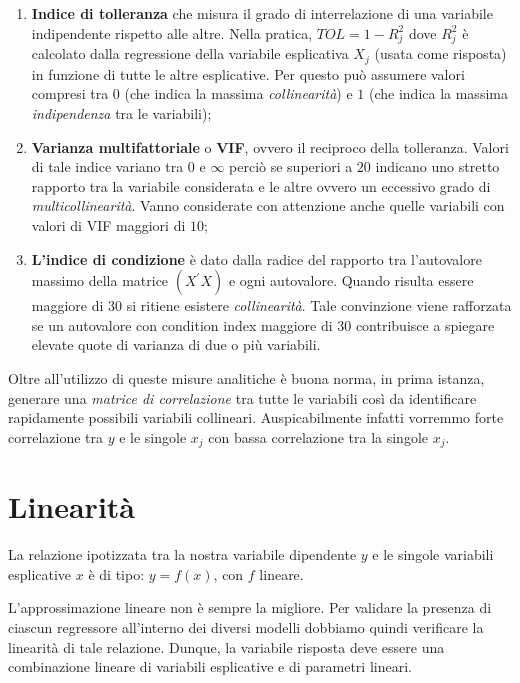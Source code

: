 \documentclass[a4page, 11pt]{article} %
\begin{document}
\begin{enumerate}[noitemsep]
\item \textbf{Indice di tolleranza} che misura il grado di interrelazione di una variabile indipendente rispetto alle altre. Nella pratica, $TOL = 1 - R^{2}_j$ dove $R^{2}_j$ è calcolato dalla regressione della variabile esplicativa $X_j$ (usata come risposta) in funzione di tutte le altre esplicative. Per questo può assumere valori compresi tra $0$ (che indica la massima \textit{collinearità}) e $1$ (che indica la massima \textit{indipendenza} tra le variabili);

\item \textbf{Varianza multifattoriale} o \textbf{VIF}, ovvero il reciproco della tolleranza. 
Valori di tale indice variano tra $0$ e $\infty$ perciò se superiori a $20$ indicano uno stretto rapporto tra la variabile considerata e le altre ovvero un eccessivo grado di \textit{multicollinearità}. Vanno considerate con attenzione anche quelle variabili con valori di VIF maggiori di $10$;

\item \textbf{L'indice di condizione} è dato dalla radice del rapporto tra l’autovalore massimo della matrice $(X^{\prime}X)$ e ogni autovalore. Quando risulta essere maggiore di $30$ si ritiene esistere \textit{collinearità}. Tale convinzione viene rafforzata se un autovalore con condition index maggiore di $30$ contribuisce a spiegare elevate quote di varianza di due o più variabili.
\end{enumerate}
Oltre all'utilizzo di queste misure analitiche è buona norma, in prima istanza, generare una \textit{matrice di correlazione} tra tutte le variabili così da identificare rapidamente possibili variabili collineari. Auspicabilmente infatti vorremmo forte correlazione tra $y$ e le singole $x_j$ con bassa correlazione tra la singole $x_j$.
\section{Linearità}

La relazione ipotizzata tra la nostra variabile dipendente $y$ e le singole variabili esplicative $x$ è di tipo: $y = f (x)$, con $f$ lineare.

L'approssimazione lineare non è sempre la migliore.
Per validare la presenza di ciascun regressore all’interno dei diversi modelli dobbiamo quindi verificare la linearità di tale relazione.
Dunque, la variabile risposta deve essere una combinazione lineare di variabili esplicative e di parametri lineari.
\end{document}
